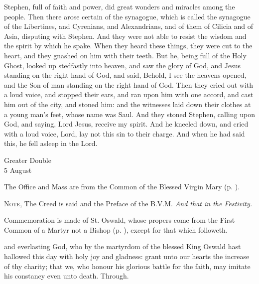  Stephen, full of faith and power, did great wonders and miracles among the people. Then there arose certain of the synagogue, which is called the synagogue of the Libertines, and Cyrenians, and Alexandrians, and of them of Cilicia and of Asia, disputing with Stephen. And they were not able to resist the wisdom and the spirit by which he spake. When they heard these things, they were cut to the heart, and they gnashed on him with their teeth. But he, being full of the Holy Ghost, looked up stedfastly into heaven, and saw the glory of God, and Jesus standing on the right hand of God, and said, Behold, I see the heavens opened, and the Son of man standing on the right hand of God. Then they cried out with a loud voice, and stopped their ears, and ran upon him with one accord, and cast him out of the city, and stoned him: and the witnesses laid down their clothes at a young man’s feet, whose name was Saul. And they stoned Stephen, calling upon God, and saying, Lord Jesus, receive my spirit. And he kneeled down, and cried with a loud voice, Lord, lay not this sin to their charge. And when he had said this, he fell asleep in the Lord.


\begin{inhead}
    {Greater Double\\
5 August}
\end{inhead}
\begin{rubric}
	The Office and Mass are from the Common of the Blessed Virgin Mary (p. \pageref{CommonBVM}).\par
	\textsc{Note,} The Creed is said and the Preface of the B.V.M. \emph{And that in the Festivity.}
\end{rubric}
\begin{rubric}
	Commemoration is made of St. Oswald, whose propers come from the First Common of a Martyr not a Bishop (p. \pageref{CommonMartyrNotBishopII}), except for that which followeth.
\end{rubric}
\collect
{} and everlasting God, who by the martyrdom of the blessed King Oswald hast hallowed this day with holy joy and gladness: grant unto our hearts the increase of thy charity; that we, who honour his glorious battle for the faith, may imitate his constancy even unto death. Through.

